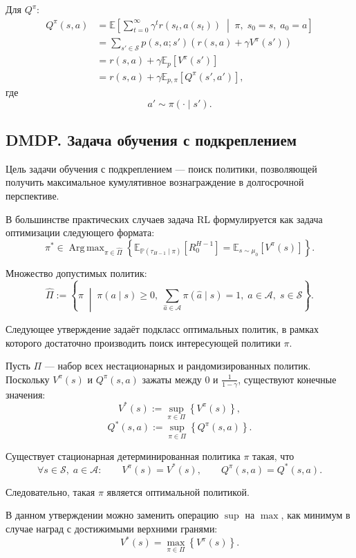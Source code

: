 \documentclass[12pt,a4paper]{article}
\begin{document}
Для $Q^\pi$:
\[
\begin{aligned}
Q^\pi(s,a)
&=
\mathbb E
\left[
\sum_{t=0}^{\infty}
\gamma^t r(s_t,a(s_t))
\;\middle|\;
\pi,\; s_0=s,\; a_0=a
\right]
\\
&=
\sum_{s' \in \mathcal S}
p(s,a;s')
\left(
r(s,a) + \gamma V^\pi(s')
\right)
\\
&=
r(s,a)
+
\gamma \mathbb E_p
\left[
V^\pi(s')
\right]
\\
&=
r(s,a)
+
\gamma \mathbb E_{p,\pi}
\left[
Q^\pi(s',a')
\right],
\end{aligned}
\]
где
\[
a' \sim \pi(\cdot \mid s').
\]

\subsection{DMDP. Задача обучения с подкреплением}

Цель задачи обучения с подкреплением --- поиск политики, позволяющей получить максимальное кумулятивное вознаграждение в долгосрочной перспективе.

В большинстве практических случаев задача RL формулируется как задача оптимизации следующего формата:
\[
\pi^\ast
\in
\operatorname{Arg\,max}_{\pi \in \hat \Pi}
\left\{
\mathbb E_{\mathbb P(\tau_{H-1}\mid \pi)}
\left[
R_0^{H-1}
\right]
=
\mathbb E_{s \sim \mu_0}
\left[
V^\pi(s)
\right]
\right\}.
\]

Множество допустимых политик:
\[
\hat \Pi
:=
\left\{
\pi
\;\middle|\;
\pi(a \mid s) \ge 0,\;
\sum_{\hat a \in \mathcal A}
\pi(\hat a \mid s)=1,\;
a \in \mathcal A,\;
s \in \mathcal S
\right\}.
\]

Следующее утверждение задаёт подкласс оптимальных политик, в рамках которого достаточно производить поиск интересующей политики $\pi$.

Пусть $\Pi$ --- набор всех нестационарных и рандомизированных политик. Поскольку $V^\pi(s)$ и $Q^\pi(s,a)$ зажаты между $0$ и $\frac{1}{1-\gamma}$, существуют конечные значения:
\[
V^\ast(s)
:=
\sup_{\pi \in \Pi}
\left\{
V^\pi(s)
\right\},
\]
\[
Q^\ast(s,a)
:=
\sup_{\pi \in \Pi}
\left\{
Q^\pi(s,a)
\right\}.
\]

Существует стационарная детерминированная политика $\pi$ такая, что
\[
\forall s \in \mathcal S,\; a \in \mathcal A:
\qquad
V^\pi(s) = V^\ast(s),
\qquad
Q^\pi(s,a) = Q^\ast(s,a).
\]

Следовательно, такая $\pi$ является оптимальной политикой.

В данном утверждении можно заменить операцию $\sup$ на $\max$, как минимум в случае наград с достижимыми верхними гранями:
\[
V^\ast(s)
=
\max_{\pi \in \Pi}
\left\{
V^\pi(s)
\right\}.
\]
\end{document}
